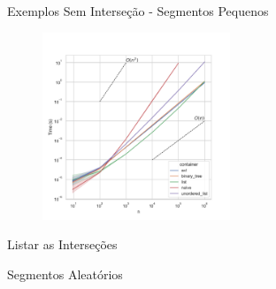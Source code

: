 \documentclass[aspectratio=169,usenames,dvipsnames]{beamer}
\begin{document}
\begin{frame}{Exemplos Sem Interseção - Segmentos Pequenos}
     \begin{figure}
        \includegraphics[width=0.5\textwidth]{figs/tempos/plot_small_detection_time.pdf}
      \end{figure}
\end{frame}


\begin{frame}{Listar as Interseções}
\end{frame}

\begin{frame}{Segmentos Aleatórios}
\end{frame}
\end{document}
